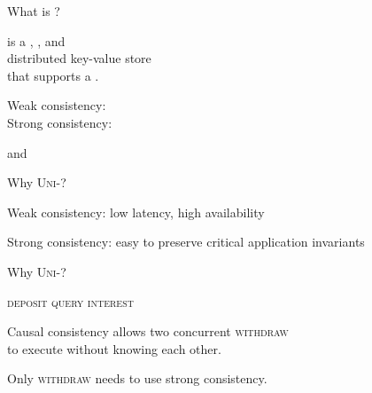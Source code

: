 \begin{frame}{What is \unistore?}
  \begin{center}
    \unistore{} is a , , and  \\[8pt]
     distributed key-value store \\[8pt]
    that supports a .

    \pause
    \vspace{0.80cm}
    Weak consistency: \cc \\[6pt]
    Strong consistency: \ser
  \end{center}
\end{frame}

\begin{frame}{\cc{} and \ser}
\end{frame}

\begin{frame}{Why \textsc{Uni-}?}
  \begin{center}
    Weak consistency: low latency, high availability


    Strong consistency: easy to preserve critical application invariants
  \end{center}
\end{frame}

\begin{frame}{Why \textsc{Uni-}?}
  \begin{center}
    \textsc{deposit \quad {} \quad query \quad interest}

    \pause
    \vspace{0.30cm}
    Causal consistency allows two concurrent \textsc{withdraw} \\
    to execute without knowing each other.

    \pause
    \vspace{0.30cm}
    Only \textsc{withdraw} needs to use strong consistency.
  \end{center}
\end{frame}


